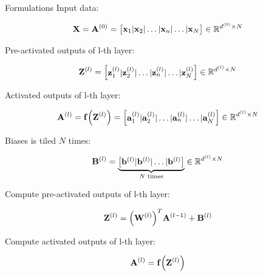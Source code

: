 \documentclass[10pt]{beamer}
\theoremstyle{remark}
\theoremstyle{definition}
\begin{document}
\begin{frame}[allowframebreaks]{Formulations}
	Input data:

	\begin{equation}
		\bold{X}=\bold{A}^{(0)}=\begin{bmatrix} \bold{x}_1 \vert \bold{x}_2 \vert \dots \vert \bold{x}_n \vert \dots \vert  \bold{x}_N \end{bmatrix} \in \mathbb{R}^{d^{(0)} \times N}
	\end{equation}

	Pre-activated outputs of l-th layer:

	\begin{equation}
		\bold{Z}^{(l)}=\begin{bmatrix} \bold{z}_1^{(l)} \vert \bold{z}_2^{(l)} \vert \dots \vert \bold{z}_n^{(l)} \vert \dots \vert \bold{z}_N^{(l)} \end{bmatrix} \in \mathbb{R}^{d^{(l)} \times N}
	\end{equation}

	Activated outputs of l-th layer:

	\begin{equation}
		\bold{A}^{(l)}=\bold{f}\Big(\bold{Z}^{(l)}\Big)=\begin{bmatrix} \bold{a}_1^{(l)} \vert \bold{a}_2^{(l)} \vert \dots \vert \bold{a}_n^{(l)} \vert \dots \vert \bold{a}_N^{(l)} \end{bmatrix} \in \mathbb{R}^{d^{(l)} \times N}
	\end{equation}

	Biases is tiled $N$ times:

	\begin{equation}
		\bold{B}^{(l)}=\underbrace{\begin{bmatrix} \bold{b}^{(l)} \vert \bold{b}^{(l)} \vert \dots \vert \bold{b}^{(l)} \end{bmatrix}}_{N\text{ times}} \in \mathbb{R}^{d^{(l)} \times N}
	\end{equation}

	Compute pre-activated outputs of l-th layer:

	\begin{equation}
		\bold{Z}^{(l)}=\Big(\bold{W}^{(l)}\Big)^T\bold{A}^{(l-1)} + \bold{B}^{(l)}
	\end{equation}

	Compute activated outputs of l-th layer:

	\begin{equation}
		\bold{A}^{(l)} = \bold{f} \Big( \bold{Z}^{(l)} \Big)
	\end{equation}


\end{frame}
\end{document}
